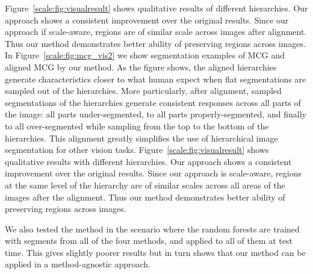 Figure~\ref{scale:fig:visualresult} shows qualitative results of different hierarchies. Our approach shows a consistent improvement over the original results. Since our approach if scale-aware, regions are of similar scale across images after alignment. Thus our method demonstrates better ability of preserving regions across images. In Figure~\ref{scale:fig:mcg_vis2} we show segmentation examples of MCG and
aligned MCG by our method. As the figure shows, the aligned
hierarchies generate characteristics closer to what human expect when
flat segmentations are sampled out of the hierarchies. More
particularly, after alignment, sampled segmentations of the
hierarchies generate consistent responses across all parts of the
image: all parts under-segmented, to all parts properly-segmented, and
finally to all over-segmented while sampling from the top to the
bottom of the hierarchies. This alignment greatly simplifies the use
of hierarchical image segmentation for other vision tasks.
Figure~\ref{scale:fig:visualresult} shows qualitative results with
different hierarchies. Our approach shows a consistent improvement
over the original results. Since our approach is scale-aware, regions
at the same level of the hierarchy are of similar scales across all
areas of the images after the alignment. Thus our method demonstrates
better ability of preserving regions across images.

We also tested the method in the scenario where the random forests are
trained with segments from all of the four methods, and applied to all
of them at test time. This gives slightly poorer results but in turn shows 
that our method can be applied in a method-agnostic approach.



